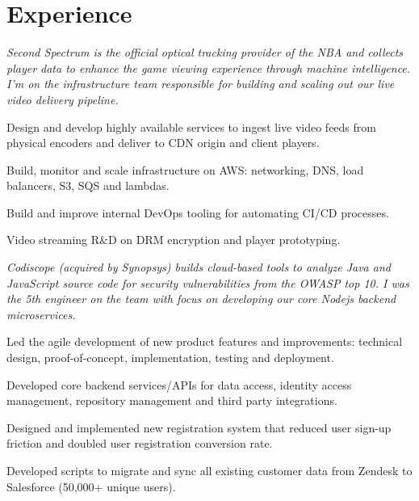 \documentclass[letterpaper]{deedy-resume} %
\begin{document}
\begin{minipage}[t]{0.66\textwidth} %


\section{Experience}

\textit{Second Spectrum is the official optical tracking provider of the NBA and collects player data to enhance the game viewing experience through machine intelligence. I'm on the infrastructure team responsible for building and scaling out our live video delivery pipeline.}
\vspace{3.5mm}
\begin{tightitemize}
\item Design and develop highly available services to ingest live video feeds from physical encoders and deliver to CDN origin and client players.
\item Build, monitor and scale infrastructure on AWS: networking, DNS, load balancers, S3, SQS and lambdas.
\item Build and improve internal DevOps tooling for automating CI/CD processes.
\item Video streaming R\&D on DRM encryption and player prototyping.
\end{tightitemize}

\sectionspace %


\textit{Codiscope (acquired by Synopsys) builds cloud-based tools to analyze Java and JavaScript source code for security vulnerabilities from the OWASP top 10. I was the 5th engineer on the team with focus on developing our core Nodejs backend microservices.}
\vspace{1.0mm} %
\begin{tightitemize}
\item Led the agile development of new product features and improvements: technical design, proof-of-concept, implementation, testing and deployment.
\item Developed core backend services/APIs for data access, identity access management, repository management and third party integrations.
\item Designed and implemented new registration system that reduced user sign-up friction and doubled user registration conversion rate.
\item Developed scripts to migrate and sync all existing customer data from Zendesk to Salesforce (50,000+ unique users).
\end{tightitemize}


\end{minipage}
\end{document}
